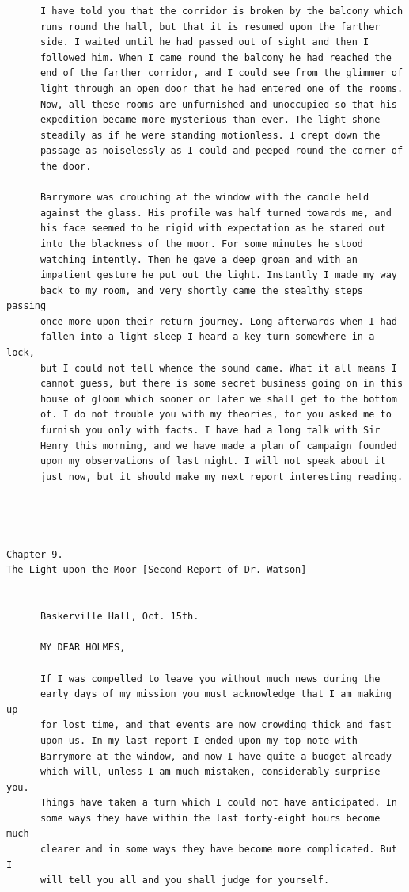 \documentclass{article}
\begin{document}
\begin{verbatim}
      I have told you that the corridor is broken by the balcony which
      runs round the hall, but that it is resumed upon the farther
      side. I waited until he had passed out of sight and then I
      followed him. When I came round the balcony he had reached the
      end of the farther corridor, and I could see from the glimmer of
      light through an open door that he had entered one of the rooms.
      Now, all these rooms are unfurnished and unoccupied so that his
      expedition became more mysterious than ever. The light shone
      steadily as if he were standing motionless. I crept down the
      passage as noiselessly as I could and peeped round the corner of
      the door.

      Barrymore was crouching at the window with the candle held
      against the glass. His profile was half turned towards me, and
      his face seemed to be rigid with expectation as he stared out
      into the blackness of the moor. For some minutes he stood
      watching intently. Then he gave a deep groan and with an
      impatient gesture he put out the light. Instantly I made my way
      back to my room, and very shortly came the stealthy steps passing
      once more upon their return journey. Long afterwards when I had
      fallen into a light sleep I heard a key turn somewhere in a lock,
      but I could not tell whence the sound came. What it all means I
      cannot guess, but there is some secret business going on in this
      house of gloom which sooner or later we shall get to the bottom
      of. I do not trouble you with my theories, for you asked me to
      furnish you only with facts. I have had a long talk with Sir
      Henry this morning, and we have made a plan of campaign founded
      upon my observations of last night. I will not speak about it
      just now, but it should make my next report interesting reading.




Chapter 9.
The Light upon the Moor [Second Report of Dr. Watson]


      Baskerville Hall, Oct. 15th.

      MY DEAR HOLMES,

      If I was compelled to leave you without much news during the
      early days of my mission you must acknowledge that I am making up
      for lost time, and that events are now crowding thick and fast
      upon us. In my last report I ended upon my top note with
      Barrymore at the window, and now I have quite a budget already
      which will, unless I am much mistaken, considerably surprise you.
      Things have taken a turn which I could not have anticipated. In
      some ways they have within the last forty-eight hours become much
      clearer and in some ways they have become more complicated. But I
      will tell you all and you shall judge for yourself.


\end{verbatim}
\end{document}
